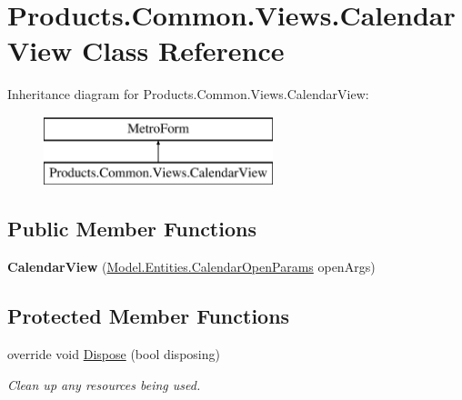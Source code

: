 \hypertarget{class_products_1_1_common_1_1_views_1_1_calendar_view}{}\section{Products.\+Common.\+Views.\+Calendar\+View Class Reference}
\label{class_products_1_1_common_1_1_views_1_1_calendar_view}
Inheritance diagram for Products.\+Common.\+Views.\+Calendar\+View\+:\begin{figure}[H]
\begin{center}
\leavevmode
\includegraphics[height=2.000000cm]{class_products_1_1_common_1_1_views_1_1_calendar_view}
\end{center}
\end{figure}
\subsection*{Public Member Functions}
\begin{DoxyCompactItemize}
\item 
{\bfseries Calendar\+View} (\hyperlink{class_products_1_1_model_1_1_entities_1_1_calendar_open_params}{Model.\+Entities.\+Calendar\+Open\+Params} open\+Args)\hypertarget{class_products_1_1_common_1_1_views_1_1_calendar_view_af254b92e3a13e1ae2e22c2f732d4e480}{}\label{class_products_1_1_common_1_1_views_1_1_calendar_view_af254b92e3a13e1ae2e22c2f732d4e480}

\end{DoxyCompactItemize}
\subsection*{Protected Member Functions}
\begin{DoxyCompactItemize}
\item 
override void \hyperlink{class_products_1_1_common_1_1_views_1_1_calendar_view_a786a8c80cbf79e0604366ca84fa07608}{Dispose} (bool disposing)
\begin{DoxyCompactList}\small\item\em Clean up any resources being used. \end{DoxyCompactList}\end{DoxyCompactItemize}
